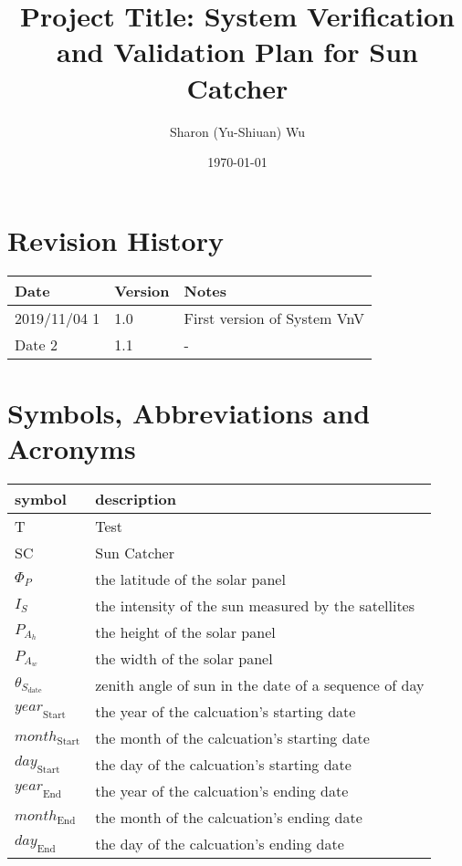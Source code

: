 \documentclass[12pt, titlepage]{article}
\begin{document}
\title{Project Title: System Verification and Validation Plan for Sun Catcher}

\author{Sharon (Yu-Shiuan) Wu} \date{\today} \maketitle
{}

\section{Revision History}

\begin{tabularx}{\textwidth}{p{3cm}p{2cm}X}
\toprule {\bf Date} & {\bf Version} & {\bf Notes}\\ 
\midrule 
2019/11/04 1 & 1.0 & First version of System VnV\\ 
Date 2 & 1.1 & -\\ 
\bottomrule 
\end{tabularx} \newpage
\tableofcontents

\listoftables

\listoffigures

\newpage

\section{Symbols, Abbreviations and Acronyms}

\renewcommand{\arraystretch}{1.2}
\begin{tabular}{l l} \toprule \textbf{symbol} & \textbf{description}\\
 \midrule T & Test\\ 
SC & Sun Catcher\\ 
$\Phi_P$ & the latitude of the solar panel \\ 
$I_{S}$ &  the intensity of the sun measured by the satellites \\ 
$P_{A_{h}}$ & the height of the solar panel \\ 
$P_{A_{w}}$ & the width of the solar panel \\
$\theta_{S_{\text{date}}}$ & zenith angle of
sun in the date of a sequence of day
  \\ 
$\mathit{year}_\text{Start}$ & the year of the calcuation's starting date\\ 
$\mathit{month}_\text{Start}$ & the month of the calcuation's starting date\\ 
$\mathit{day}_\text{Start}$ & the day of the calcuation's starting date\\ 
$\mathit{year}_\text{End}$ & the year of the calcuation's ending date\\ 
$\mathit{month}_\text{End}$ & the month of the calcuation's ending date\\ 
$\mathit{day}_\text{End}$ & the day of the calcuation's ending date\\ 
\bottomrule
\end{tabular}\\
\end{document}
